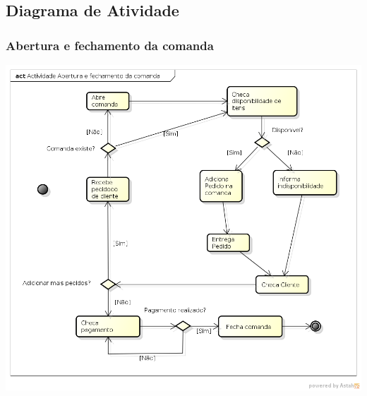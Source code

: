 \newpage
\subsection{Diagrama de Atividade}

\subsubsection{Abertura e fechamento da comanda}
    \centerline{
      \includegraphics[scale=0.6]{diagrama/abertura_fechamento.png}
    }

\newpage
